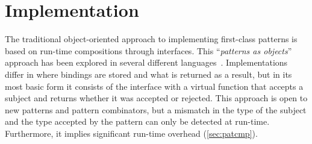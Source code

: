 \section{Implementation} %
\label{sec:impl}

The traditional object-oriented approach to implementing 
first-class patterns is based on run-time compositions through 
interfaces. This ``\emph{patterns as objects}'' approach has been 
explored in several different languages~\cite{Visser06matchingobjects,geller2010pattern,FuncCSharp,Grace2012}.
Implementations differ in where bindings are stored and what is returned as a 
result, but in its most basic form it consists of the 
 interface with a virtual function  that accepts a subject 
and returns whether it was accepted or rejected.
This approach is open to new patterns and pattern combinators, but a mismatch in the type of the subject and the 
type accepted by the pattern can only be detected at run-time.
Furthermore, it implies significant run-time overhead (\textsection\ref{sec:patcmp}).


